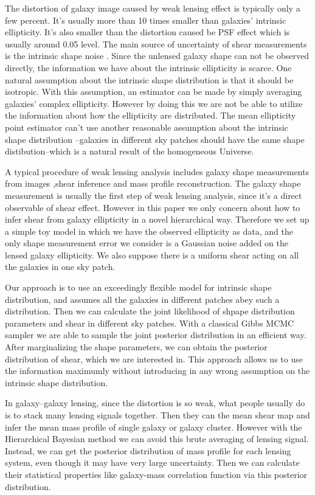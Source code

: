 \documentclass[useAMS,usenatbib]{mn2e}
\begin{document}
The distortion of galaxy image caused by weak lensing effect is typically only a few percent.
It's usually more than 10 times smaller than galaxies' intrinsic ellipticity. It's also smaller than the distortion caused
be PSF effect which is usually around 0.05 level. The main source of uncertainty of shear measurements is the intrinsic shape noise
. Since the unlensed galaxy shape can not be observed directly, the information
we have about the intrinsic ellipticity is scarce. One natural assumption about the intrinsic shape distribution is that 
it should be isotropic. With this assumption, an estimator can be made by simply averaging galaxies' complex
ellipticity. However by doing this we are not be able to utilize the
information about how the ellipticity are distributed. The mean ellipticity
point estimator can't use another reasonable assumption about the intrinsic shape distribution --galaxies in different sky patches should have
the same shape distibution--which is a natural result of the homogeneous Universe.

A typical procedure of weak lensing analysis  includes galaxy shape measurements from images
,shear inference and mass profile reconstruction. The galaxy shape measurement is usually the
first step of weak lensing analysis, since it's a direct observable of shear effect. However
in this paper we only concern about how to infer shear from galaxy
ellipticity in a novel hierarchical way. Therefore we set up a simple toy model in which we have the observed ellipticity as
data, and the only shape measurement error we consider is a Gaussian noise
added on the lensed galaxy ellipticity. We also suppose there is a uniform shear
acting on all the galaxies in one sky patch.

Our approach is to use an exceedingly flexible model for intrinsic
shape distribution, and assumes all the galaxies in different patches
abey such a distribution. Then we can calculate the joint likelihood
of shpape distribution parameters and shear in different sky patches. With
a classical Gibbs MCMC sampler we are able to sample the joint posterior distribution
in an efficient way. After marginalizing the shape parameters, we can obtain
the posterior distribution of shear, which we are interested in. This
approach allows us to use the information maximumly without introducing
in any wrong assumption on the intrinsic shape distribution.

In galaxy--galaxy lensing, since the distortion is so weak, what people
usually do is to stack many lensing signals together. Then they can the mean
shear map and infer the mean mass profile of single galaxy or galaxy
cluster. However with the Hierarchical Bayesian method we can avoid this brute averaging
of lensing signal. Instead, we can get the posterior distribution of mass profile for
each lensing system, even though it may have very large uncertainty. Then we
can calculate their statistical properties like galaxy-mass correlation
function via this posterior distribution.
\end{document}
